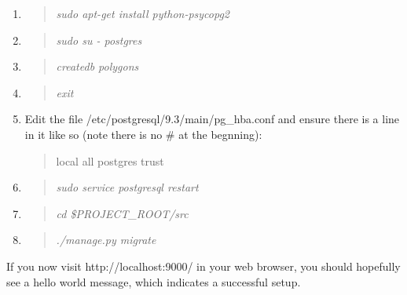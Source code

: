 \documentclass[12pt]{article}
\newenvironment{command}
   { 
      \begin{quote}\itshape
      \color{blue}
   }
   { \end{quote} }
\newenvironment{data}
   { 
      \begin{quote}\itshape
      \color{red}
   }
   { \end{quote} }
\begin{document}
\begin{enumerate}
   \item \begin{command} sudo apt-get install python-psycopg2 \end{command}
   \item \begin{command} sudo su - postgres \end{command}
   \item \begin{command} createdb polygons \end{command}
   \item \begin{command} exit \end{command}
   \item Edit the file /etc/postgresql/9.3/main/pg\_hba.conf and ensure there is
         a line in it like so (note there is no \# at the begnning):
         \begin{data}
         local all postgres trust
         \end{data}
   \item \begin{command} sudo service postgresql restart \end{command}
   \item \begin{command} cd \$PROJECT\_ROOT/src \end{command}
   \item \begin{command} ./manage.py migrate \end{command}
\end{enumerate}

If you now visit http://localhost:9000/ in your web browser, you should
hopefully see a hello world message, which indicates a successful setup.
\end{document}
